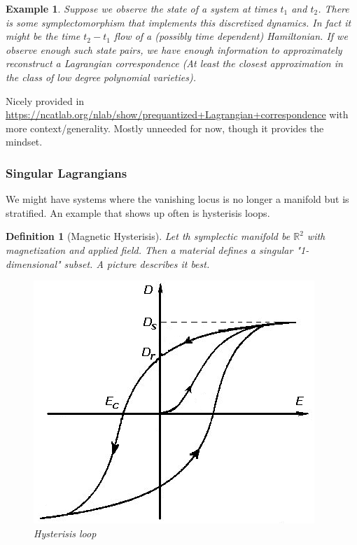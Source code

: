 \documentclass[a4paper,landscape]{article}
\theoremstyle{change}
\newtheorem{definition}[equation]{Definition}
\newtheorem{example}[equation]{Example}
\theoremstyle{nonumberplain}
\numberwithin{equation}{section}
\begin{document}
\begin{example}
Suppose we observe the state of a system at times $t_1$ and $t_2$. There is some symplectomorphism that implements this discretized dynamics. In fact it might be the time $t_2 - t_1$ flow of a (possibly time dependent) Hamiltonian. If we observe enough such state pairs, we have enough information to approximately reconstruct a Lagrangian correspondence (At least the closest approximation in the class of low degree polynomial varieties).
\end{example}

Nicely provided in \url{https://ncatlab.org/nlab/show/prequantized+Lagrangian+correspondence} with more context/generality. Mostly unneeded for now, though it provides the mindset.

\subsubsection{Singular Lagrangians}

We might have systems where the vanishing locus is no longer a manifold but is stratified. An example that shows up often is hysterisis loops.

\begin{definition}[Magnetic Hysterisis]
Let th symplectic manifold be $\mathbb{R}^2$ with magnetization and applied field. Then a material defines a singular "1-dimensional" subset. A picture describes it best.

\begin{figure}[htb!]
\centering
\includegraphics[scale=.2]{Hysteresis.png}
\caption{Hysterisis loop}
\end{figure}

\end{definition}
\end{document}
